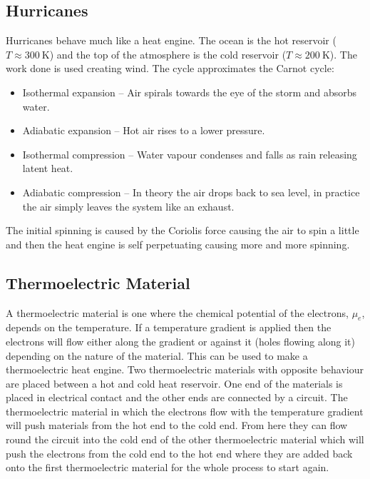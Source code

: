     \subsection{Hurricanes}
    Hurricanes behave much like a heat engine.
    The ocean is the hot reservoir (\(T \approx \SI{300}{\kelvin}\)) and the top of the atmosphere is the cold reservoir (\(T \approx \SI{200}{\kelvin}\)).
    The work done is used creating wind.
    The cycle approximates the Carnot cycle:
    \begin{itemize}
        \item Isothermal expansion -- Air spirals towards the eye of the storm and absorbs water.
        \item Adiabatic expansion -- Hot air rises to a lower pressure.
        \item Isothermal compression -- Water vapour condenses and falls as rain releasing latent heat.
        \item Adiabatic compression -- In theory the air drops back to sea level, in practice the air simply leaves the system like an exhaust.
    \end{itemize}
    The initial spinning is caused by the Coriolis force causing the air to spin a little and then the heat engine is self perpetuating causing more and more spinning.
    
    \subsection{Thermoelectric Material}
    A thermoelectric material is one where the chemical potential of the electrons, \(\mu_e\), depends on the temperature.
    If a temperature gradient is applied then the electrons will flow either along the gradient or against it (holes flowing along it) depending on the nature of the material.
    This can be used to make a thermoelectric heat engine.
    Two thermoelectric materials with opposite behaviour are placed between a hot and cold heat reservoir.
    One end of the materials is placed in electrical contact and the other ends are connected by a circuit.
    The thermoelectric material in which the electrons flow with the temperature gradient will push materials from the hot end to the cold end.
    From here they can flow round the circuit into the cold end of the other thermoelectric material which will push the electrons from the cold end to the hot end where they are added back onto the first thermoelectric material for the whole process to start again.
